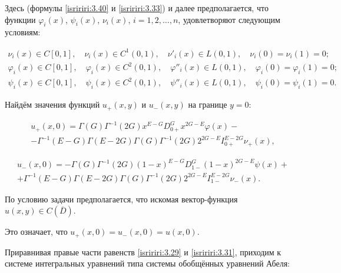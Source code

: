 Здесь (формулы \eqref{isririri:3.40} и \eqref{isririri:3.33}) и  далее предполагается,  что функции $\varphi_i(x)$, $\psi_i(x)$, $\nu_i(x)$, $i=1, 2,\ldots,n$, удовлетворяют следующим условиям:

\begin{gather}

\nu_i(x)\in C[0, 1], \quad  \nu_i(x)\in C^{1}(0, 1), \quad  \nu'_i(x)\in L(0, 1), \quad  \nu_i(0)=\nu_i(1)=0;\\

\varphi_i(x)\in C[0, 1], \quad  \varphi_i(x)\in C^{2}(0, 1), \quad  \varphi''_i(x)\in L(0, 1), \quad  \varphi_i(0)=\varphi_i(1)=0;\\

\psi_i(x)\in C[0, 1], \quad  \psi_i(x)\in C^{2}(0, 1), \quad  \psi''_i(x)\in L(0, 1), \quad  \psi_i(0)=\psi_i(1)=0.

\end{gather}



Найдём значения функций $u_{+}(x, y)$ и $u_{-}(x, y)$ на границе $y=0$:

\begin{multline}\label{isririri:3.29}

u_+(x, 0)=\Gamma(G)\Gamma^{-1}(2G)x^{E-G}D^{G}_{0+}x^{2G-E}\varphi(x)-\\

-\Gamma^{-1}(E-G)\Gamma(E-2G)\Gamma(G)\Gamma^{-1}(2G)2^{2G-E}I^{E-2G}_{0+}\nu_+(x),

\end{multline}

\begin{multline}\label{isririri:3.31}

u_-(x, 0)=-\Gamma(G)\Gamma^{-1}(2G)(1-x)^{E-G}D^{G}_{1-}(1-x)^{2G-E}\psi(x)+\\

+\Gamma^{-1}(E-G)\Gamma(E-2G)\Gamma(G)\Gamma^{-1}(2G)2^{2G-E}I^{E-2G}_{1-}\nu_-(x).

\end{multline}



По условию задачи предполагается, что искомая вектор-функция $u(x,y)\in {C}(\overline{D})$. 

Это означает, что $u_+(x, 0)=u_-(x, 0)=u(x, 0)$.

Приравнивая правые части равенств \eqref{isririri:3.29} и \eqref{isririri:3.31}, приходим к системе интегральных уравнений типа системы обобщённых уравнений Абеля:

